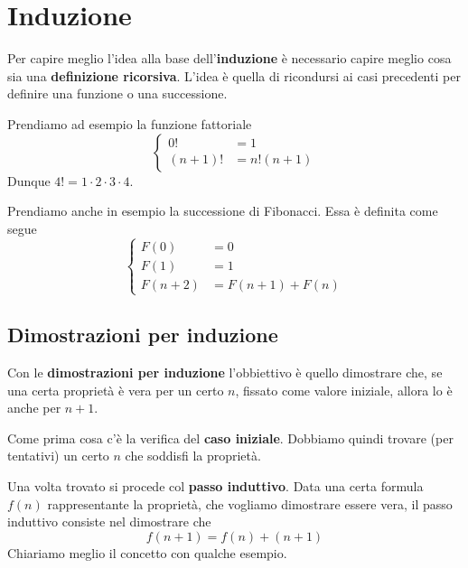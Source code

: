 \chapter{Induzione}
Per capire meglio l'idea alla base dell'\textbf{induzione} \`e necessario capire meglio cosa sia una
\textbf{definizione ricorsiva}. L'idea \`e quella di ricondursi ai casi precedenti per definire una funzione o una
successione.

\begin{example}
	Prendiamo ad esempio la funzione fattoriale
	\[
		\begin{cases}
			0!       & = 1          \\
			(n + 1)! & = n! (n + 1)
		\end{cases}
	\]
	Dunque $4! = 1 \cdot 2 \cdot 3 \cdot 4$.
\end{example}

\begin{example}
	Prendiamo anche in esempio la successione di Fibonacci. Essa \`e definita come
	segue
	\[
		\begin{cases}
			F(0)     & = 0               \\
			F(1)     & = 1               \\
			F(n + 2) & = F(n + 1) + F(n)
		\end{cases}
	\]
\end{example}

\section{Dimostrazioni per induzione}
Con le \textbf{dimostrazioni per induzione} l'obbiettivo \`e quello dimostrare che, se una certa propriet\`a \`e vera
per un certo $n$, fissato come valore iniziale, allora lo \`e anche per $n + 1$.

Come prima cosa c'\`e la verifica del \textbf{caso iniziale}. Dobbiamo quindi trovare (per tentativi) un certo $n$ che
soddisfi la propriet\`a.

Una volta trovato si procede col \textbf{passo induttivo}. Data una certa formula $f(n)$ rappresentante la propriet\`a,
che vogliamo dimostrare essere vera, il passo induttivo consiste nel dimostrare che
\[ f(n + 1) = f(n) + (n + 1) \]
Chiariamo meglio il concetto con qualche esempio.


